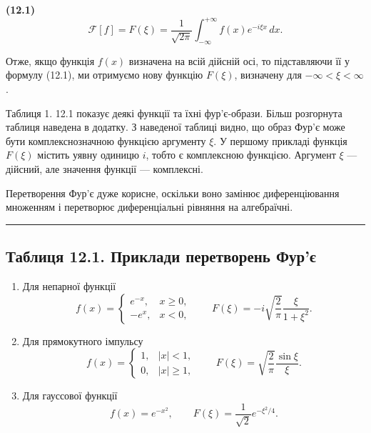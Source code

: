 \documentclass[
  ukrainian,
]{article}
\begin{document}
\textbf{(12.1)} \[
\mathcal{F}[f] = F(\xi) = \frac{1}{\sqrt{2\pi}} \int_{-\infty}^{+\infty} f(x)e^{-i\xi x}\,dx.
\]

Отже, якщо функція \(f(x)\) визначена на всій дійсній осі, то
підставляючи її у формулу (12.1), ми отримуємо нову функцію \(F(\xi)\),
визначену для \(-\infty < \xi < \infty\).

Таблиця 1. 12.1 показує деякі функції та їхні фур'є-образи. Більш
розгорнута таблиця наведена в додатку. З наведеної таблиці видно, що
образ Фур'є може бути комплекснозначною функцією аргументу \(\xi\). У
першому прикладі функція \(F(\xi)\) містить уявну одиницю \(i\), тобто є
комплексною функцією. Аргумент \(\xi\) --- дійсний, але значення функції
--- комплексні.

Перетворення Фур'є дуже корисне, оскільки воно замінює диференціювання
множенням і перетворює диференціальні рівняння на алгебраїчні.

\begin{center}\rule{0.5\linewidth}{0.5pt}\end{center}

\subsection{Таблиця 12.1. Приклади перетворень
Фур'є}\label{ux442ux430ux431ux43bux438ux446ux44f-12.1.-ux43fux440ux438ux43aux43bux430ux434ux438-ux43fux435ux440ux435ux442ux432ux43eux440ux435ux43dux44c-ux444ux443ux440ux454}

\begin{enumerate}
\def\labelenumi{\arabic{enumi}.}
\item
  Для непарної функції\\
  \[
  f(x)=
  \begin{cases}
  e^{-x}, & x\ge 0,\\
  -e^{x}, & x<0,
  \end{cases}
  \qquad
  F(\xi)=-i\sqrt{\frac{2}{\pi}}\frac{\xi}{1+\xi^2}.
  \]
\item
  Для прямокутного імпульсу\\
  \[
  f(x)=
  \begin{cases}
  1, & |x|<1,\\
  0, & |x|\ge 1,
  \end{cases}
  \qquad
  F(\xi)=\sqrt{\frac{2}{\pi}}\frac{\sin\xi}{\xi}.
  \]
\item
  Для гауссової функції\\
  \[
  f(x)=e^{-x^2},
  \qquad
  F(\xi)=\frac{1}{\sqrt{2}}e^{-\xi^2/4}.
  \]
\end{enumerate}
\end{document}
